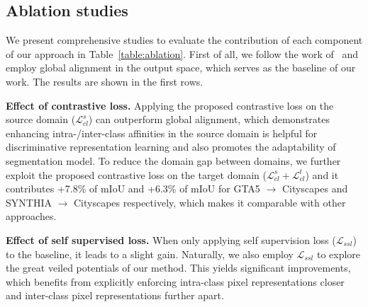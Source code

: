 \documentclass[runningheads]{llncs}
\newcommand{\Lm}{\mathcal{L}}
\begin{document}
\subsection{Ablation studies}
\label{sec:ablation}
We present comprehensive studies to evaluate the contribution of each component of our approach in Table~\ref{table:ablation}. First of all, we follow the work of~\cite{tsai2018learning} and employ global alignment in the output space, which serves as the baseline of our work. The results are shown in the first rows. 

{\bf Effect of contrastive loss.} Applying the proposed contrastive loss on the source domain ($\Lm_{cl}^s$) can outperform global alignment, which demonstrates enhancing intra-/inter-class affinities in the source domain is helpful for discriminative representation learning and also promotes the adaptability of segmentation model. To reduce the domain gap between domains, we further exploit the proposed contrastive loss on the target domain ($\Lm_{cl}^s + \Lm_{cl}^t$) and it contributes +{7.8}\% of mIoU and +{6.3}\% of mIoU for GTA5 $\rightarrow$ Cityscapes and SYNTHIA $\rightarrow$ Cityscapes respectively, which makes it comparable with other approaches. 

{\bf Effect of self supervised loss.} When only applying self supervision loss ($\mathcal{L}_{ssl}$) to the baseline, it leads to a slight gain. Naturally, we also employ $\mathcal{L}_{ssl}$ to explore the great veiled potentials of our method. This yields significant improvements, which benefits from explicitly enforcing intra-class pixel representations closer and inter-class pixel representations further apart.
\end{document}
